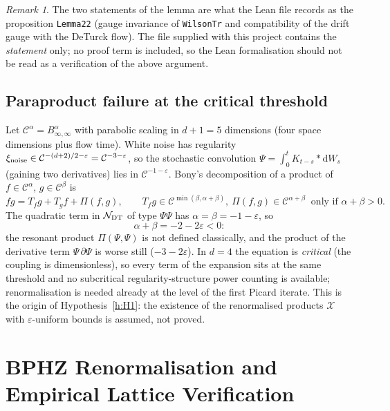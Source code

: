 \documentclass[11pt,a4paper]{article}
\theoremstyle{definition}
\theoremstyle{remark}
\newtheorem{remark}[theorem]{Remark}
\newcommand{\dd}{\mathrm{d}}
\begin{document}
\begin{remark}
The two statements of the lemma are what the Lean file records as the proposition \texttt{Lemma22} (gauge invariance of \texttt{WilsonTr} and compatibility of the drift gauge with the DeTurck flow). The file supplied with this project contains the \emph{statement} only; no proof term is included, so the Lean formalisation should not be read as a verification of the above argument.
\end{remark}

\subsection{Paraproduct failure at the critical threshold}\label{sec:parap}

Let $\mathcal C^\alpha=B^\alpha_{\infty,\infty}$ with parabolic scaling in $d+1=5$ dimensions (four space dimensions plus flow time). White noise has regularity $\xi_{\rm noise}\in\mathcal C^{-(d+2)/2-\varepsilon}=\mathcal C^{-3-\varepsilon}$, so the stochastic convolution $\Psi=\int_0^t K_{t-s}*\dd W_s$ (gaining two derivatives) lies in $\mathcal C^{-1-\varepsilon}$. Bony's decomposition of a product of $f\in\mathcal C^\alpha$, $g\in\mathcal C^\beta$ is
\begin{equation}
fg=T_fg+T_gf+\Pi(f,g),\qquad T_fg\in\mathcal C^{\min(\beta,\alpha+\beta)},\ \Pi(f,g)\in\mathcal C^{\alpha+\beta}\ \text{ only if }\alpha+\beta>0.
\end{equation}
The quadratic term in $\mathcal N_{\rm DT}$ of type $\Psi\Psi$ has $\alpha=\beta=-1-\varepsilon$, so
\begin{equation}
\alpha+\beta=-2-2\varepsilon<0:
\end{equation}
the resonant product $\Pi(\Psi,\Psi)$ is not defined classically, and the product of the derivative term $\Psi\,\partial\Psi$ is worse still ($-3-2\varepsilon$). In $d=4$ the equation is \emph{critical} (the coupling is dimensionless), so every term of the expansion sits at the same threshold and no subcritical regularity-structure power counting is available; renormalisation is needed already at the level of the first Picard iterate. This is the origin of Hypothesis~\ref{h:H1}: the existence of the renormalised products $\mathcal X$ with $\varepsilon$-uniform bounds is assumed, not proved.

\section{BPHZ Renormalisation and Empirical Lattice Verification}\label{sec:bphz}
\end{document}
